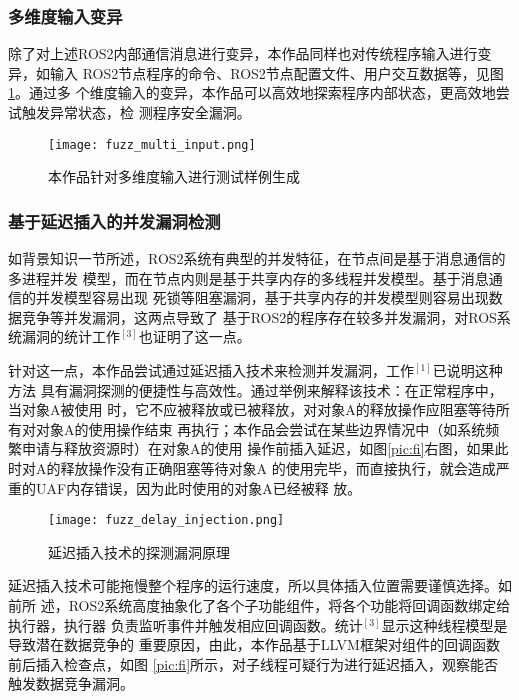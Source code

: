 \subsubsection{多维度输入变异}

除了对上述ROS2内部通信消息进行变异，本作品同样也对传统程序输入进行变异，如输入
ROS2节点程序的命令、ROS2节点配置文件、用户交互数据等，见图\ref{pic:fmi}。通过多
个维度输入的变异，本作品可以高效地探索程序内部状态，更高效地尝试触发异常状态，检
测程序安全漏洞。

\begin{figure}[h]
    \centering
    \texttt{[image: fuzz\_multi\_input.png]}
    \caption{本作品针对多维度输入进行测试样例生成}
    \label{pic:fmi}
\end{figure}

\subsubsection{基于延迟插入的并发漏洞检测}

如背景知识一节所述，ROS2系统有典型的并发特征，在节点间是基于消息通信的多进程并发
模型，而在节点内则是基于共享内存的多线程并发模型。基于消息通信的并发模型容易出现
死锁等阻塞漏洞，基于共享内存的并发模型则容易出现数据竞争等并发漏洞，这两点导致了
基于ROS2的程序存在较多并发漏洞，对ROS系统漏洞的统计工作$^{[3]}$也证明了这一点。

针对这一点，本作品尝试通过延迟插入技术来检测并发漏洞，工作$^{[1]}$已说明这种方法
具有漏洞探测的便捷性与高效性。通过举例来解释该技术：在正常程序中，当对象A被使用
时，它不应被释放或已被释放，对对象A的释放操作应阻塞等待所有对对象A的使用操作结束
再执行；本作品会尝试在某些边界情况中（如系统频繁申请与释放资源时）在对象A的使用
操作前插入延迟，如图\ref{pic:fi}右图，如果此时对A的释放操作没有正确阻塞等待对象A
的使用完毕，而直接执行，就会造成严重的UAF内存错误，因为此时使用的对象A已经被释
放。

\begin{figure}[h]
    \centering
    \texttt{[image: fuzz\_delay\_injection.png]}
    \caption{延迟插入技术的探测漏洞原理}
    \label{pic:fdi}
\end{figure}

延迟插入技术可能拖慢整个程序的运行速度，所以具体插入位置需要谨慎选择。如前所
述，ROS2系统高度抽象化了各个子功能组件，将各个功能将回调函数绑定给执行器，执行器
负责监听事件并触发相应回调函数。统计$^{[3]}$显示这种线程模型是导致潜在数据竞争的
重要原因，由此，本作品基于LLVM框架对组件的回调函数前后插入检查点，如图
\ref{pic:fi}所示，对子线程可疑行为进行延迟插入，观察能否触发数据竞争漏洞。

